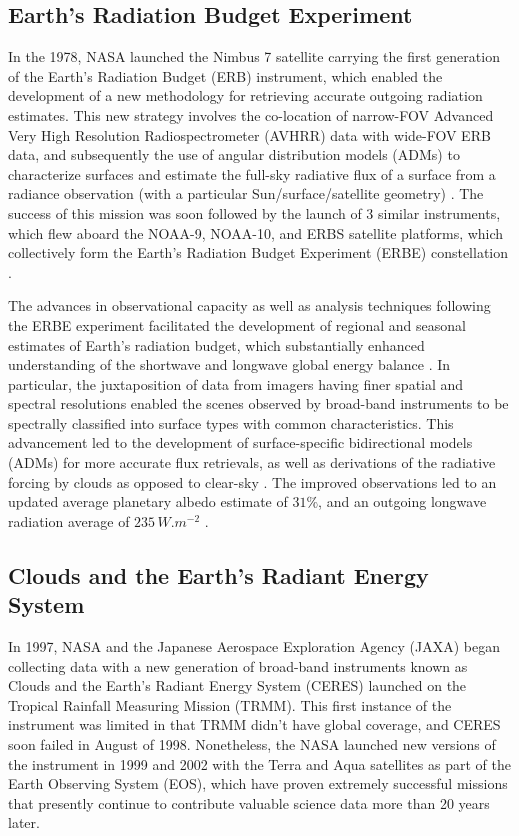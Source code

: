 \documentclass[12pt]{article}
\begin{document}
    \subsection{Earth's Radiation Budget Experiment}

    In the 1978, NASA launched the Nimbus 7 satellite carrying the first generation of the Earth's Radiation Budget (ERB) instrument, which enabled the development of a new methodology for retrieving accurate outgoing radiation estimates. This new strategy involves the co-location of narrow-FOV Advanced Very High Resolution Radiospectrometer (AVHRR) data with wide-FOV ERB data, and subsequently the use of angular distribution models (ADMs) to characterize surfaces and estimate the full-sky radiative flux of a surface from a radiance observation (with a particular Sun/surface/satellite geometry) \cite{taylor_reflectance_1984}\cite{jacobowitz_earth_1983}. The success of this mission was soon followed by the launch of 3 similar instruments, which flew aboard the NOAA-9, NOAA-10, and ERBS satellite platforms, which collectively form the Earth's Radiation Budget Experiment (ERBE) constellation \cite{barkstrom_earth_1984}.

    The advances in observational capacity as well as analysis techniques following the ERBE experiment facilitated the development of regional and seasonal estimates of Earth's radiation budget, which substantially enhanced understanding of the shortwave and longwave global energy balance \cite{breon_global_1994}. In particular, the juxtaposition of data from imagers having finer spatial and spectral resolutions enabled the scenes observed by broad-band instruments to be spectrally classified into surface types with common characteristics. This advancement led to the development of surface-specific bidirectional models (ADMs) for more accurate flux retrievals, as well as derivations of the radiative forcing by clouds as opposed to clear-sky \cite{ramanathan_cloud-radiative_1989}\cite{smith_inversion_1986}. The improved observations led to an updated average planetary albedo estimate of $31\%$, and an outgoing longwave radiation average of $235\,\si{W.m^{-2}}$ \cite{kiehl_earth_1997}.

    \subsection{Clouds and the Earth's Radiant Energy System}

    In 1997, NASA and the Japanese Aerospace Exploration Agency (JAXA) began collecting data with a new generation of broad-band instruments known as Clouds and the Earth's Radiant Energy System (CERES) launched on the Tropical Rainfall Measuring Mission (TRMM). This first instance of the instrument was limited in that TRMM didn't have global coverage, and CERES soon failed in August of 1998. Nonetheless, the NASA launched new versions of the instrument in 1999 and 2002 with the Terra and Aqua satellites as part of the Earth Observing System (EOS), which have proven extremely successful missions that presently continue to contribute valuable science data more than 20 years later.
\end{document}
